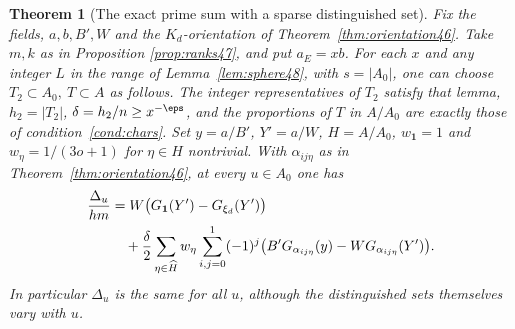 \documentclass[a4paper,11pt]{article}
\newtheorem{theorem}[proposition]{Theorem}
\theoremstyle{definition}
\theoremstyle{remark}
\numberwithin{equation}{section}
\begin{document}
\begin{theorem}[The exact prime sum with a sparse distinguished set]\label{thm:sparse48}
Fix the fields, \(a,b,B',W\) and the \(K_d\)-orientation of
Theorem~\ref{thm:orientation46}. Take \(m,k\) as in
Proposition \ref{prop:ranks47},
and put \(a_E=xb\). For each \(x\) and any integer \(L\) in the range
of Lemma~\ref{lem:sphere48}, with \(s=|A_0|\), one can choose
\(T_2\subset A_0,\ T\subset A\) as follows. The integer representatives
of \(T_2\) satisfy that lemma, \(h_2=|T_2|\), \(\delta=h_2/n\ge x^{-\eps}\),
and the proportions of \(T\) in \(A/A_0\) are exactly those of
condition~\ref{cond:chars}. Set \(y=a/B'\), \(Y'=a/W\),
\(H=A/A_0\), \(w_{\mathbf1}=1\) and \(w_\eta=1/(3o+1)\) for
\(\eta\in\widehat H\) nontrivial. With \(\alpha_{ij\eta}\) as in
Theorem~\ref{thm:orientation46}, at every \(u\in A_0\) one has
\begin{align}
 \frac{\Delta_u}{hm}
 &=W\bigl(G_{\mathbf1}(Y')-G_{\xi_d}(Y')\bigr) \notag\\
 &\quad+\frac{\delta}{2}\sum_{\eta\in\widehat H}w_\eta
       \sum_{i,j=0}^1(-1)^j
       \bigl(B'G_{\alpha_{ij\eta}}(y)-W G_{\alpha_{ij\eta}}(Y')\bigr).
                                                               \label{eq:sparse48}
\end{align}
In particular \(\Delta_u\) is the same for all \(u\), although the
distinguished sets themselves vary with \(u\).
\end{theorem}
\end{document}
